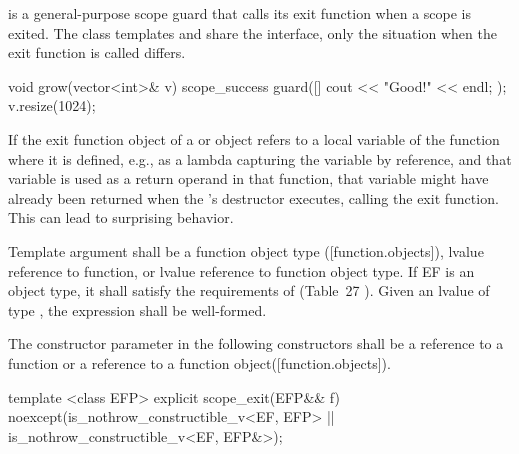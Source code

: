 \documentclass[ebook,11pt,article]{memoir}
\begin{document}
\pnum
{} is a general-purpose scope guard that calls its exit function when a scope is exited. The class templates  and  share the  interface, only the situation when the exit function is called differs.\\
\begin{example}
\begin{codeblock}
void grow(vector<int>& v){
	scope_success guard([]{ cout << "Good!" << endl; });
	v.resize(1024);
}
\end{codeblock}
\end{example}

\pnum
\begin{note}
If the exit function object of a  or  object refers to a local variable of the function where it is defined, e.g., as a lambda capturing the variable by reference, and that variable is used as a return operand in that function, that variable might have already been returned when the 's destructor executes, calling the exit function. This can lead to surprising behavior. 
\end{note}


\pnum
\requires
Template argument  shall be a function object type ([function.objects]), 
lvalue reference to function, or 
lvalue reference to function object type.
If EF is an object type, it  shall satisfy
the requirements of  (Table~27
). 
Given an lvalue  of type , the expression  shall be well-formed.

\pnum
The constructor parameter  in the following constructors shall be a reference to a function or a reference to a function object([function.objects]). 


\begin{itemdecl}
template <class EFP>
explicit
scope_exit(EFP&& f) noexcept(is_nothrow_constructible_v<EF, EFP>  
                          || is_nothrow_constructible_v<EF, EFP&>);
\end{itemdecl}
\end{document}
